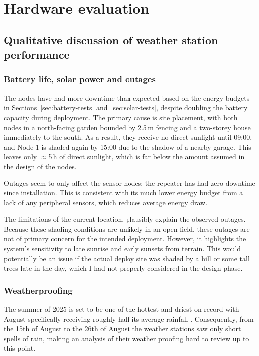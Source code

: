 \section{Hardware evaluation}\label{hardware-evaluation}

\subsection{Qualitative discussion of weather station performance}

\subsubsection{Battery life, solar power and
  outages}\label{sec:hardware-evaluation-power}

The nodes have had more downtime than expected based on the energy budgets in
Sections~\ref{sec:battery-tests} and~\ref{sec:solar-tests}, despite doubling the
battery capacity during deployment. The primary cause is site placement, with
both nodes in a north-facing garden bounded by 2.5\,m fencing and a two-storey
house immediately to the south. As a result, they receive no direct sunlight
until 09:00, and Node 1 is shaded again by 15:00 due to the shadow of a nearby
garage. This leaves only \(\approx\)5\,h of direct sunlight, which is far below
the amount assumed in the design of the nodes.

Outages seem to only affect the sensor nodes; the repeater has had zero downtime
since installation. This is consistent with its much lower energy budget from a
lack of any peripheral sensors, which reduces average energy draw.

The limitations of the current location, plausibly explain the observed outages.
Because these shading conditions are unlikely in an open field, these outages
are not of primary concern for the intended deployment. However, it highlights
the system's sensitivity to late sunrise and early sunsets from terrain. This
would potentially be an issue if the actual deploy site was shaded by a hill or
some tall trees late in the day, which I had not properly considered in the
design phase.

\subsubsection{Weatherproofing}

The summer of 2025 is set to be one of the hottest and driest on record with
August specifically receiving roughly half its average rainfall
\cite{uor2025summer}. Consequently, from the 15th of August to the 26th of
August the weather stations saw only short spells of rain, making an analysis of
their weather proofing hard to review up to this point.

